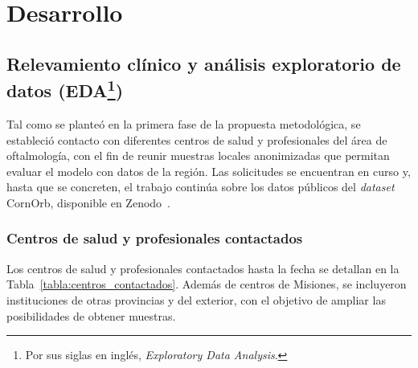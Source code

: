 \newpage
{}
\chapter{Desarrollo}

\section[Relevamiento clínico y análisis exploratorio de datos (EDA)]{Relevamiento clínico y análisis exploratorio de datos (EDA\footnote{Por sus siglas en inglés, \textit{Exploratory Data Analysis}.})}

    Tal como se planteó en la primera fase de la propuesta metodológica, se estableció contacto con diferentes centros de salud y profesionales del área de oftalmología, con el fin de reunir muestras locales anonimizadas que permitan evaluar el modelo con datos de la región. Las solicitudes se encuentran en curso y, hasta que se concreten, el trabajo continúa sobre los datos públicos del \textit{dataset} CornOrb, disponible en Zenodo~\cite{zenodo}.

    \subsection{Centros de salud y profesionales contactados}

        Los centros de salud y profesionales contactados hasta la fecha se detallan en la Tabla~\ref{tabla:centros_contactados}. Además de centros de Misiones, se incluyeron instituciones de otras provincias y del exterior, con el objetivo de ampliar las posibilidades de obtener muestras.

